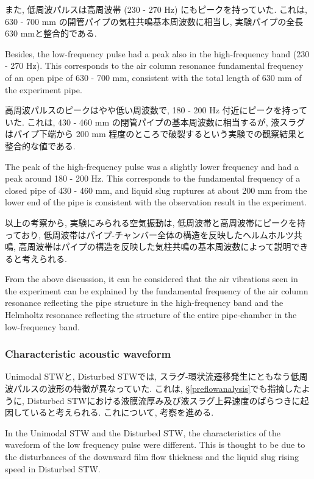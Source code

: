 \documentclass[12pt]{article}
\begin{document}
また, 低周波パルスは高周波帯 (230 - 270 Hz) にもピークを持っていた. 
これは, 630 - 700 mm の開管パイプの気柱共鳴基本周波数に相当し, 実験パイプの全長 630 mmと整合的である. 

Besides, the low-frequency pulse had a peak also in the high-frequency band (230 - 270 Hz).
This corresponds to the air column resonance fundamental frequency of an open pipe of 630 - 700 mm, consistent with the total length of 630 mm of the experiment pipe.

高周波パルスのピークはやや低い周波数で, 180 - 200 Hz 付近にピークを持っていた. 
これは, 430 - 460 mm の閉管パイプの基本周波数に相当するが, 液スラグはパイプ下端から 200 mm 程度のところで破裂するという実験での観察結果と整合的な値である. 

The peak of the high-frequency pulse was a slightly lower frequency and had a peak around 180 - 200 Hz.
This corresponds to the fundamental frequency of a closed pipe of 430 - 460 mm, and liquid slug ruptures at about 200 mm from the lower end of the pipe is consistent with the observation result in the experiment.

以上の考察から, 実験にみられる空気振動は, 低周波帯と高周波帯にピークを持っており, 低周波帯はパイプ-チャンバー全体の構造を反映したヘルムホルツ共鳴, 高周波帯はパイプの構造を反映した気柱共鳴の基本周波数によって説明できると考えられる.

From the above discussion, it can be considered that the air vibrations seen in the experiment can be explained by the fundamental frequency of the air column resonance reflecting the pipe structure in the high-frequency band and the Helmholtz resonance reflecting the structure of the entire pipe-chamber in the low-frequency band.


\subsubsection{Characteristic acoustic waveform}
Unimodal STWと, Disturbed STWでは, スラグ-環状流遷移発生にともなう低周波パルスの波形の特徴が異なっていた. 
これは, \S \ref{preflowanalysis}でも指摘したように, Disturbed STWにおける液膜流厚み及び液スラグ上昇速度のばらつきに起因していると考えられる. これについて, 考察を進める.

In the Unimodal STW and the Disturbed STW, the characteristics of the waveform of the low frequency pulse were different.
This is thought to be due to the disturbances of the downward film flow thickness and the liquid slug rising speed in Disturbed STW.
\end{document}
